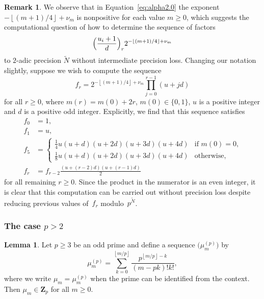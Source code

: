 \documentclass[a4paper,11pt]{article}
\numberwithin{equation}{section}
\providecommand{\floor}[1]{\left\lfloor#1\right\rfloor}   %
\newcommand{\ZZ}{\mathbf{Z}} %
\theoremstyle{definition}
\newtheorem{lem}[thm]{Lemma}
\newtheorem{rem}[thm]{Remark}
\begin{document}
\begin{rem}
We observe that in Equation~\eqref{eq:alpha2.0} the exponent 
$-\floor{(m+1)/4}+\nu_m$ is nonpositive for each value $m \geq 0$, 
which suggests the computational question of how to determine the 
sequence of factors 
\begin{equation*}
\Bigl(\frac{u_i+1}{d}\Bigr)_r 2^{- \floor{(m+1)/4} + \nu_m}
\end{equation*}
to $2$-adic precision $\tilde{N}$ without intermediate precision loss.
Changing our notation slightly, suppose we wish to compute the sequence
\begin{equation*}
f_r = 2^{- \floor{(m+1)/4} + \nu_m} \prod_{j=0}^{r-1} (u + j d)
\end{equation*}
for all $r \geq 0$, where $m(r) = m(0) + 2r$, $m(0) \in \{0,1\}$, 
$u$ is a positive integer and $d$ is a positive odd integer.
Explicitly, we find that this sequence satisfies 
\begin{align*}
f_0 & = 1, \\
f_1 & = u, \\
f_5 & = \begin{cases}
        \displaystyle \tfrac{1}{4} u (u + d) (u + 2d) (u + 3d) (u + 4d)
            & \text{if $m(0)=0$,} \\
        \displaystyle \tfrac{1}{8} u (u + d) (u + 2d) (u + 3d) (u + 4d)
            & \text{otherwise,}
        \end{cases} \\
f_r & = f_{r-2} \frac{(u + (r - 2)d)(u + (r - 1)d)}{2}
\end{align*}
for all remaining $r \geq 0$.  Since the product in the numerator is 
an even integer, it is clear that this computation can be carried 
out without precision loss despite reducing previous values of~$f_r$ 
modulo~$p^{\tilde{N}}$.
\end{rem}

\subsubsection{The case $p > 2$}

\begin{lem} \label{lem:mup}
Let $p \geq 3$ be an odd prime and define a sequence 
$\bigl(\mu_m^{(p)}\bigr)$ by 
\begin{equation}
\mu_m^{(p)} = \sum_{k=0}^{\floor{m/p}} \frac{p^{\floor{m/p} - k}}{(m-pk)! k!}, 
\end{equation}
where we write $\mu_m = \mu_m^{(p)}$ when the prime can be identified 
from the context.  Then $\mu_m \in \ZZ_p$ for all $m \geq 0$.
\end{lem}
\end{document}

